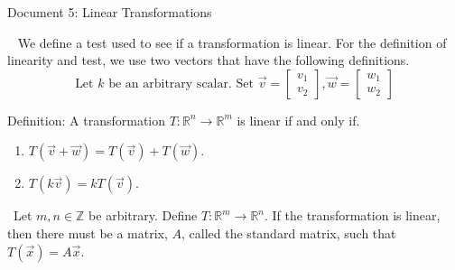 \documentclass[12pt]{article}
\begin{document}
\begin{center}
Document 5: Linear Transformations
\end{center}

\setlength{\leftskip}{0 in}
$\,\,\,$ We define a test used to see if a transformation is linear. For the definition of linearity and test, we use two vectors that have the following definitions.
$$\text{Let } k \text{ be an arbitrary scalar. Set } \vec{v}=\begin{bmatrix}v_1\\v_2\end{bmatrix},\vec{w}=\begin{bmatrix}w_1\\w_2\end{bmatrix}
$$

Definition: A transformation $T:\mathbb{R}^n\rightarrow \mathbb{R}^m$ is linear if and only if.
\begin{enumerate}
\item $T(\vec{v}+\vec{w})=T(\vec{v})+T(\vec{w})$.
\item $T(k\vec{v})=kT(\vec{v})$.\\
\end{enumerate}

$\,\,\,$Let $m,n\in\mathbb{Z}$ be arbitrary. Define $T:\mathbb{R}^m\rightarrow\mathbb{R}^n$. If the transformation is linear, then there must be a matrix, $A$, called the standard matrix, such that $T(\vec{x})=A\vec{x}$.
\end{document}

